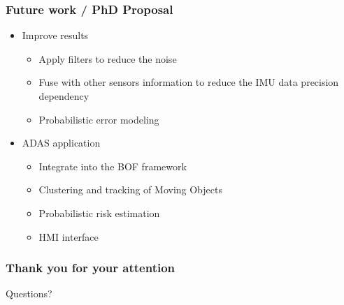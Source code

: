 \documentclass{beamer}
\begin{document}
	\begin{frame}
		\frametitle{Future work / PhD Proposal}

			\begin{itemize}
			\item Improve results 
			
				\begin{itemize}
				\item Apply filters to reduce the noise
				\item Fuse with other sensors information to reduce the IMU data precision dependency
				\item Probabilistic error modeling
				\end{itemize}			
				
			\item ADAS application
			
				\begin{itemize}
				\item Integrate into the BOF framework
				\item Clustering and tracking of Moving Objects
				\item Probabilistic risk estimation
				\item HMI interface
				\end{itemize}

			\end{itemize}
		
	\end{frame}

	\begin{frame}
		\frametitle{Thank you for your attention}	
	
	\begin{alertblock}{}
		\centering
		Questions?
	\end{alertblock}
	\end{frame} 	

 	
{} 	
\end{document}
